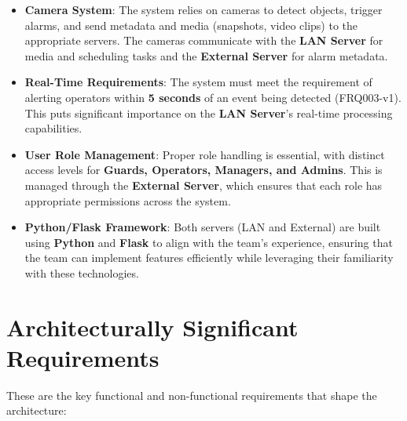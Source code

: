 \documentclass{article}
\begin{document}
\begin{itemize}
    \item \textbf{Camera System}: The system relies on cameras to detect objects, trigger alarms, and send metadata and media (snapshots, video clips) to the appropriate servers. The cameras communicate with the \textbf{LAN Server} for media and scheduling tasks and the \textbf{External Server} for alarm metadata.
    \item \textbf{Real-Time Requirements}: The system must meet the requirement of alerting operators within \textbf{5 seconds} of an event being detected (FRQ003-v1). This puts significant importance on the \textbf{LAN Server}'s real-time processing capabilities.
    \item \textbf{User Role Management}: Proper role handling is essential, with distinct access levels for \textbf{Guards, Operators, Managers, and Admins}. This is managed through the \textbf{External Server}, which ensures that each role has appropriate permissions across the system.
    \item \textbf{Python/Flask Framework}: Both servers (LAN and External) are built using \textbf{Python} and \textbf{Flask} to align with the team’s experience, ensuring that the team can implement features efficiently while leveraging their familiarity with these technologies.
\end{itemize}

\section{Architecturally Significant Requirements}

These are the key functional and non-functional requirements that shape the architecture:
\end{document}
